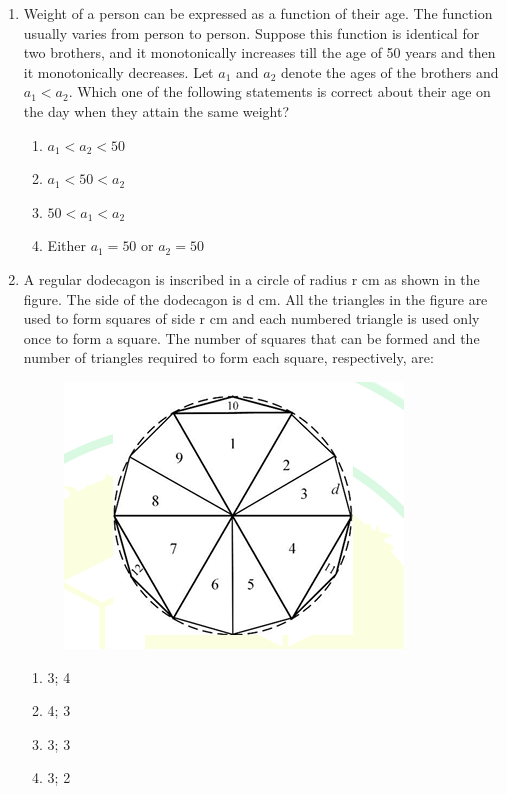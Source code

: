 \documentclass[journal,12pt,onecolumn]{IEEEtran}
\theoremstyle{remark}
\begin{document}
\begin{enumerate}
\item Weight of a person can be expressed as a function of their age. The function usually varies from person to person. Suppose this function is identical for two brothers, and it monotonically increases till the age of 50 years and then it monotonically decreases. Let $a_{1}$ and $a_{2}$  denote the ages of the brothers and $a_{1}<a_{2}$. Which one of the following statements is correct about their age on the day when they attain the same weight?
    \begin{enumerate}
        \item $a_{1}<a_{2}<50$
        \item $a_{1}<50<a_{2}$
        \item $50<a_{1}<a_{2}$
        \item Either $a_{1}=50$ or $a_{2}=50$
    \end{enumerate}      \hfill{}



\item A regular dodecagon  is inscribed in a circle of radius r cm as shown in the figure. The side of the dodecagon is d cm. All the triangles  in the figure are used to form squares of side r cm and each numbered triangle is used only once to form a square. The number of squares that can be formed and the number of triangles required to form each square, respectively, are:
    \begin{figure}[H]
        \centering
        \includegraphics[width=0.4\columnwidth]{figs/q8.png}
        \caption*{}
        \label{fig:placeholder}
    \end{figure}
    \begin{enumerate}
        \item 3; 4
        \item 4; 3
        \item 3; 3
        \item 3; 2
    \end{enumerate}      \hfill{}




\end{enumerate}
\end{document}

